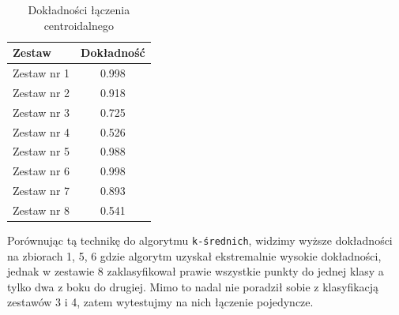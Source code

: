 \documentclass[polish,12pt,a4paper]{extarticle}
\begin{document}
\begin{table}[h!]
\centering
\begin{tabular}{|l|c|}
\hline
\textbf{Zestaw} & \textbf{Dokładność} \\
\hline
Zestaw nr 1 & 0.998 \\
Zestaw nr 2 & 0.918 \\
Zestaw nr 3 & 0.725 \\
Zestaw nr 4 & 0.526 \\
Zestaw nr 5 & 0.988 \\
Zestaw nr 6 & 0.998 \\
Zestaw nr 7 & 0.893 \\
Zestaw nr 8 & 0.541 \\
\hline
\end{tabular}
\caption{Dokładności łączenia centroidalnego}
\label{tab:metrics}
\end{table}
\noindent Porównując tą technikę do algorytmu \texttt{k-średnich}, widzimy wyższe dokładności na zbiorach 1, 5, 6 gdzie algorytm uzyskał ekstremalnie wysokie dokładności, jednak w zestawie 8 zaklasyfikował prawie wszystkie punkty do jednej klasy a tylko dwa z boku do drugiej. Mimo to nadal nie poradził sobie z klasyfikacją zestawów 3 i 4, zatem wytestujmy na nich łączenie pojedyncze.
\end{document}
